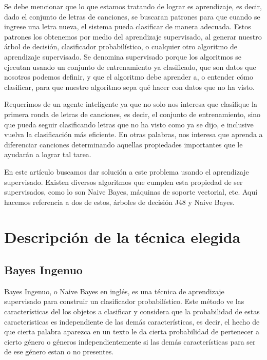 \documentclass[spanish,11pt,letterpaper]{article}
\begin{document}
Se debe mencionar que lo que estamos tratando de lograr es aprendizaje, es decir, dado el conjunto
de letras de canciones, se buscaran patrones para que cuando se ingrese una letra nueva, el sistema
pueda clasificar de manera adecuada. Estos patrones los obtenemos por medio del aprendizaje
supervisado, al generar nuestro árbol de decisión, clasificador probabilístico,
o cualquier otro algoritmo de aprendizaje
supervisado. Se denomina supervisado porque los algoritmos se ejecutan usando un conjunto de
entrenamiento ya clasificado, que son datos que nosotros podemos definir, y que el algoritmo debe
aprender a, o entender cómo clasificar, para que nuestro algoritmo sepa qué hacer con datos
que no ha visto.

Requerimos de un agente inteligente ya que no solo nos interesa que clasifique la primera
ronda de letras de canciones, es decir, el conjunto de entrenamiento, sino que pueda seguir
clasificando letras que no ha visto como ya se dijo, e inclusive vuelva la clasificación
más eficiente. En otras palabras, nos interesa que aprenda a diferenciar canciones determinando
aquellas propiedades importantes que le ayudarán a lograr tal tarea.

En este artículo buscamos dar solución a este problema usando el aprendizaje supervisado. Existen
diversos algoritmos que cumplen esta propiedad de ser supervisados, como lo son Naive
Bayes, máquinas de soporte vectorial, etc. Aquí hacemos referencia a dos de estos,
árboles de decisión J48 y Naive Bayes.

\section{Descripción de la técnica elegida}

\subsection{Bayes Ingenuo}

Bayes Ingenuo, o Naive Bayes en inglés, es una técnica de aprendizaje supervisado para construir un
clasificador probabilístico. Este método ve las características del los objetos a clasificar y considera que la
probabilidad de estas caracteristicas es independiente de las demás características, es decir, el
hecho de que cierta palabra aparezca en un texto le da cierta probabilidad de pertenecer a cierto
género o géneros independientemente si las demás características para ser de ese género estan o no
presentes.
\end{document}
